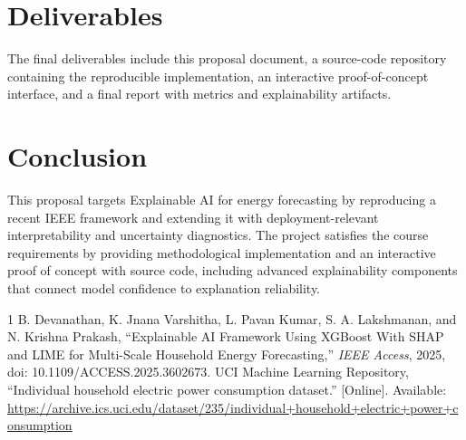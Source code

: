 \documentclass[conference]{IEEEtran}
\begin{document}
\section{Deliverables}
The final deliverables include this proposal document, a source-code repository containing the reproducible implementation, an interactive proof-of-concept interface, and a final report with metrics and explainability artifacts.

\section{Conclusion}
This proposal targets Explainable AI for energy forecasting by reproducing a recent IEEE framework and extending it with deployment-relevant interpretability and uncertainty diagnostics. The project satisfies the course requirements by providing methodological implementation and an interactive proof of concept with source code, including advanced explainability components that connect model confidence to explanation reliability.


\begin{thebibliography}{1}
 B. Devanathan, K. Jnana Varshitha, L. Pavan Kumar, S. A. Lakshmanan, and N. Krishna Prakash, ``Explainable AI Framework Using XGBoost With SHAP and LIME for Multi-Scale Household Energy Forecasting,'' \emph{IEEE Access}, 2025, doi: 10.1109/ACCESS.2025.3602673.
 UCI Machine Learning Repository, ``Individual household electric power consumption dataset.'' [Online]. Available: \url{https://archive.ics.uci.edu/dataset/235/individual+household+electric+power+consumption}
\end{thebibliography}
\end{document}

